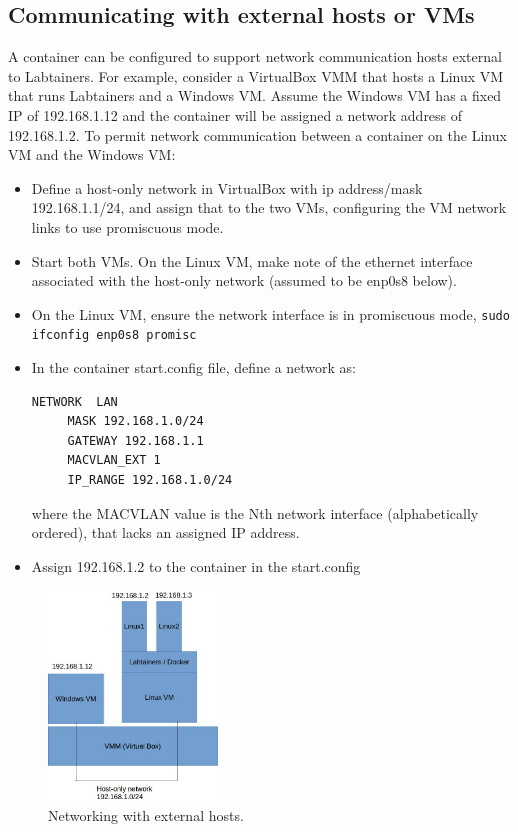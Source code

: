 \documentclass[12pt]{article}
\begin{document}
\subsection{Communicating with external hosts or VMs}
\label {external hosts}
A container can be configured to support network communication hosts external to Labtainers.
For example, consider a VirtualBox VMM that hosts a Linux VM that runs Labtainers and
a Windows VM.  Assume the Windows VM has a fixed IP of 192.168.1.12 and the container 
will be assigned a network address of 192.168.1.2.  To permit network communication between 
a container on the Linux VM and the Windows VM:
\begin{itemize}
\item Define a host-only network in VirtualBox with ip address/mask 192.168.1.1/24, and assign that to the two VMs, configuring the VM
network links to use promiscuous mode.
\item Start both VMs.  On the Linux VM, make note of the ethernet interface associated with the host-only network (assumed to be enp0s8 below).
\item On the Linux VM, ensure the network interface is in promiscuous mode, {\tt sudo ifconfig enp0s8 promisc}
\item In the container start.config file, define a network as:
\begin{verbatim}
NETWORK  LAN
     MASK 192.168.1.0/24
     GATEWAY 192.168.1.1
     MACVLAN_EXT 1
     IP_RANGE 192.168.1.0/24
\end{verbatim}
\noindent where the MACVLAN value is the Nth network interface (alphabetically ordered), that lacks an assigned IP address.
\item Assign 192.168.1.2 to the container in the start.config
\end{itemize}

\begin{figure}[H]
\centering
\includegraphics[width=0.4\textwidth]{ExternalNetworks.jpg}
\caption{Networking with external hosts.}
\label{fig:external hosts}
\end{figure}
\end{document}
